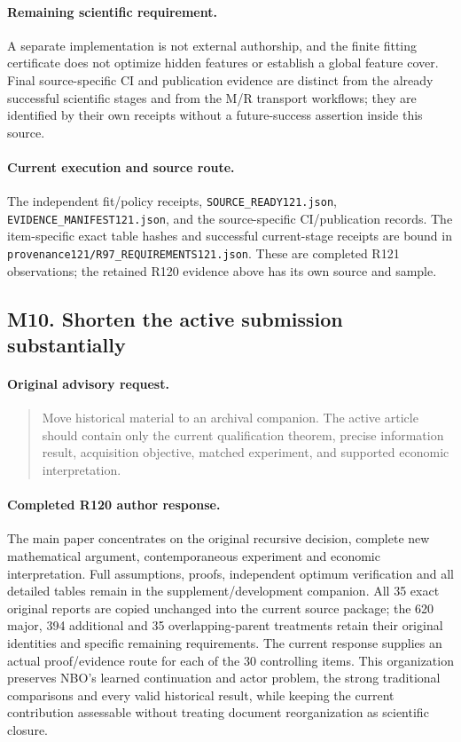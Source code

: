 \paragraph{Remaining scientific requirement.}
A separate implementation is not external authorship, and the finite fitting certificate does not optimize hidden features or establish a global feature cover. Final source-specific CI and publication evidence are distinct from the already successful scientific stages and from the M/R transport workflows; they are identified by their own receipts without a future-success assertion inside this source.

\paragraph{Current execution and source route.}
The independent fit/policy receipts, \nolinkurl{SOURCE_READY121.json}, \nolinkurl{EVIDENCE_MANIFEST121.json}, and the source-specific CI/publication records.
The item-specific exact table hashes and successful current-stage receipts are bound in \nolinkurl{provenance121/R97_REQUIREMENTS121.json}. These are completed R121 observations; the retained R120 evidence above has its own source and sample.

\subsection{M10. Shorten the active submission substantially}
\label{response121:M10}

\paragraph{Original advisory request.}
\begin{quote}
Move historical material to an archival companion. The active article should contain only the current qualification theorem, precise information result, acquisition objective, matched experiment, and supported economic interpretation.
\end{quote}

\paragraph{Completed R120 author response.}
The main paper concentrates on the original recursive decision, complete new mathematical argument, contemporaneous experiment and economic interpretation. Full assumptions, proofs, independent optimum verification and all detailed tables remain in the supplement/development companion. All 35 exact original reports are copied unchanged into the current source package; the 620 major, 394 additional and 35 overlapping-parent treatments retain their original identities and specific remaining requirements. The current response supplies an actual proof/evidence route for each of the 30 controlling items. This organization preserves NBO's learned continuation and actor problem, the strong traditional comparisons and every valid historical result, while keeping the current contribution assessable without treating document reorganization as scientific closure.

